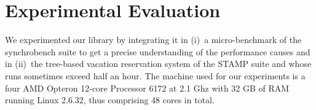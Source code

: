% 
% 
% 
% 
% 
% 





\section{Experimental Evaluation}\label{sec:expe}
We experimented our library by integrating it in (i)~a micro-benchmark of the synchrobench suite %
to get a precise understanding of the performance causes and in (ii)~the tree-based vacation 
reservation system of the STAMP suite 
and whose
runs sometimes exceed half an hour.
The machine used for our experiments is a four AMD Opteron 12-core Processor 6172 at 2.1 Ghz with 32 GB of RAM running Linux 2.6.32, thus comprising 48 cores in total.

